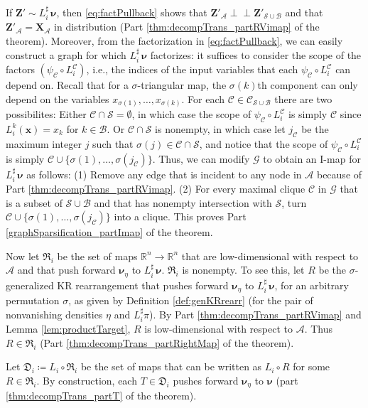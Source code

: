 \documentclass[twoside,11pt]{article}
\newcommand{\orth}{ \perp\!\!\!\perp }  %
\newcommand{\genm}{\boldsymbol{\nu} }   %
\newcommand{\re}{\mathbb{R}}
\newcommand{\ra}{\rightarrow}
\newcommand{\Bc}{\mathcal{B}}
\newcommand{\Cc}{\mathcal{C}}
\newcommand{\Ac}{\mathcal{A}}
\newcommand{\Sc}{\mathcal{S}}
\newcommand{\Xb}{\boldsymbol{X}}
\newcommand{\xb}{\boldsymbol{x}}
\newcommand{\Zb}{\boldsymbol{Z}}
\newcommand{\Gcb}{\boldsymbol{\mathcal{G}}}
\newcommand{\Ccb}{\boldsymbol{\mathcal{C}}}
\newcommand{\lmap}{L} %
\newcommand{\rmap}{R} %
\newcommand{\decset}{\mathfrak{D}} %
\newcommand{\Aset}{ \Ac }
\newcommand{\Bset}{ \Bc }
\newcommand{\Sset}{ \Sc }
\newcommand{\pull}{^\sharp}
\begin{document}
If $\Zb' \sim \lmap_i\pull \,\genm$, then 
\eqref{eq:factPullback} shows that 
$\Zb'_{\Aset} \orth \Zb'_{\Sset \cup \Bset}$ and that
$\Zb'_{\Aset} = \Xb_{\Aset}$ in distribution 
(Part \ref{thm:decompTrans_partRVimap} of the theorem).
%
%
%
Moreover, from the factorization in \eqref{eq:factPullback}, we can
easily construct a graph for which $\lmap_i\pull \,\genm$ factorizes:
%
%
%
%
it 
suffices to 
consider 
%
the scope of the factors 
$(\psi_{\Cc}\circ \lmap_i^{\Cc})$, i.e., 
the indices of the input variables that each $\psi_{\Cc}\circ \lmap_i^{\Cc}$ can depend on.
Recall that for a $\sigma$-triangular map, the $\sigma(k)$th component can only
depend
on the variables $x_{\sigma(1)},\ldots,x_{\sigma(k)}$.
For each $\Cc \in \Ccb_{\Sset \cup \Bset}$ there are two
possibilites:
Either  
$\Cc \cap \Sset = \emptyset$, in which case the scope of
$\psi_{\Cc}\circ \lmap_i^{\Cc}$ is simply $\Cc$ since
$\lmap_i^k(\xb)=x_k$ for $k \in \Bset$.
Or $\Cc \cap \Sset$ is nonempty, in which case 
let $j_{\Cc}$ be the maximum integer
$j$ such that $\sigma(j)\in \Cc \cap \Sset$, and notice that the scope of
$\psi_{\Cc}\circ \lmap_i^{\Cc}$ is simply
$\Cc \cup \{ \sigma(1),\ldots,\sigma(j_{\Cc})\}$.
Thus, we can modify $\Gcb$ to obtain an I-map for $\lmap_i\pull \, \genm$ as follows:
(1) Remove any edge that is incident to any node in $\Aset$ 
because of Part \ref{thm:decompTrans_partRVimap}.
(2) For every maximal clique $\Cc$ in $\Gcb$ that is a subset of 
$\Sset \cup \Bset$ and that has nonempty intersection with $\Sset$,  
turn $\Cc \cup \{ \sigma(1),\ldots,\sigma(j_{\Cc})\}$ into a clique.
This proves Part \ref{graphSparsification_partImap} of the theorem.

Now let $\mathfrak{R}_i$ be the set of maps $\re^n\ra \re^n$ that
are low-dimensional with respect to $\Aset$ and that push forward
$\genm_\eta$ to $\lmap_i\pull\,\genm$.
$\mathfrak{R}_i$ is nonempty.
To see this, let $\rmap$ be the 
$\sigma$-generalized KR rearrangement that 
pushes forward
$\genm_\eta$ to $\lmap_i\pull\,\genm$, for an
arbitrary permutation $\sigma$, as given by Definition \ref{def:genKRrearr} 
(for the pair of nonvanishing densities $\eta$ and $\lmap_i\pull \pi$).
By Part \ref{thm:decompTrans_partRVimap} and Lemma \ref{lem:productTarget}, 
%
%
$\rmap$ is low-dimensional with respect to $\Aset$. 
Thus $\rmap \in \mathfrak{R}_i$ (Part \ref{thm:decompTrans_partRightMap} of the theorem).

Let $\decset_i \coloneqq \lmap_i \circ \mathfrak{R}_i$ be the set of maps
that can be written as $\lmap_i \circ \rmap$ for some $\rmap \in \mathfrak{R}_i$.
By construction, each $T \in \decset_i$ pushes 
forward $\genm_\eta$ to $\genm$
(part \ref{thm:decompTrans_partT} of the theorem).
%
%
%
%
%
%
%
%
%
%
%
%
%
%
%
%
%
%
%
%
%
%
%
%
%
%
%
%
%
%
%
%
%
%
%
%
%
%
%
%
%
\hfill\BlackBox\\[2mm]
\end{document}
